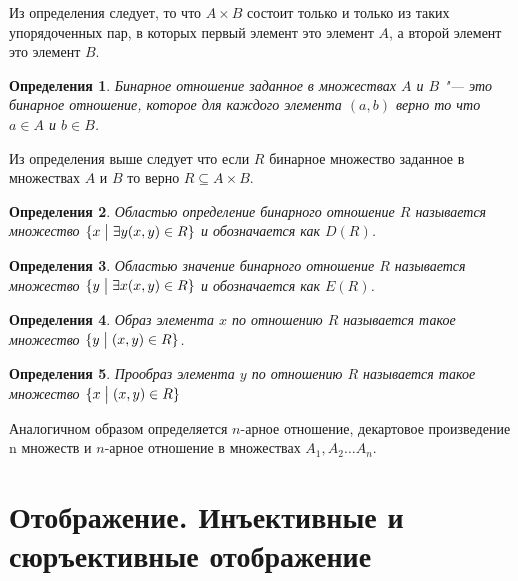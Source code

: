 \documentclass[a4paper, 16pt, oneside]{book}
\newtheorem{Definition}{Определения}[theorem]
\begin{document}
\par Из определения следует, то что \(A \times B\) состоит только и только из таких упорядоченных пар,
в которых первый элемент это элемент \(A\), а второй элемент это элемент \(B\).

\begin{Definition}
    \label{definiton:binary_relation_in_A_B}
    Бинарное отношение заданное в множествах \(A\) и \(B\) "--- это бинарное отношение,
    которое для каждого элемента \((a, b)\) верно то что \(a \in A\) и \(b \in B\).
\end{Definition}

\par Из определения выше следует что если \(R\) бинарное множество заданное в множествах \(A\) и \(B\)
то верно \(R \subseteq A \times B\).

\begin{Definition}
    \label{definiton:domain}
    Областью определение бинарного отношение \(R\) называется множество \(\{x \bigm| \exists y (x, y) \in R\}\) и обозначается как \(D(R)\).
\end{Definition}

\begin{Definition}
    \label{definiton:range}
    Областью значение бинарного отношение \(R\) называется множество \(\{y \bigm| \exists x (x, y) \in R\}\) и обозначается как \(E(R)\).
\end{Definition}

\begin{Definition}
    \label{definiton:image_of_element}
    Образ элемента \(x\) по отношению \(R\) называется такое множество \(\{y \bigm| (x, y) \in R\}\).
\end{Definition}

\begin{Definition}
    \label{definiton:prototype}
    Прообраз элемента \(y\) по отношению \(R\) называется такое множество \(\{x \bigm| (x, y) \in R\}\)
\end{Definition}

\par Аналогичном образом определяется \(n\)-арное отношение, декартовое произведение n множеств
и \(n\)-арное отношение в множествах \(A_1, A_2 \ldots A_n\).

\section{Отображение. Инъективные и сюръективные отображение}
\end{document}

